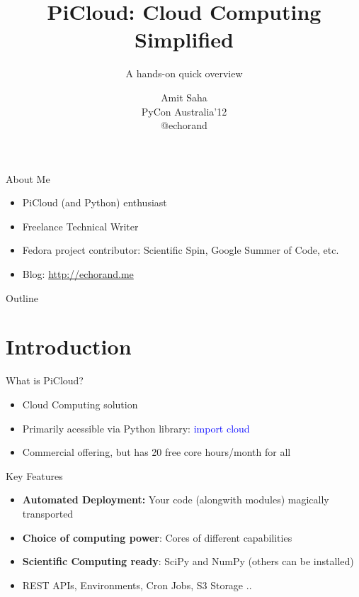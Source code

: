 \documentclass{beamer} \usepackage{fancyvrb} \usepackage{listings}
\title{PiCloud: Cloud Computing Simplified}
\subtitle{A hands-on quick overview}
\author{Amit Saha \\ PyCon Australia'12 \\ @echorand \\ }
\begin{document}
      \begin{frame}
        \titlepage
      \end{frame}

      \begin{frame}{About Me}
        \begin{itemize}
        \item PiCloud (and Python) enthusiast
        \item Freelance Technical Writer
        \item Fedora project contributor: Scientific Spin, Google Summer
          of Code, etc.
        \item Blog: \url{http://echorand.me}
        \end{itemize}
      \end{frame}

      \begin{frame}{Outline}
        \tableofcontents
      \end{frame}


      \section{Introduction}

      \begin{frame}{What is PiCloud?}
        \begin{itemize}
        \item Cloud Computing solution
        \item Primarily acessible via Python library:
          \textcolor{blue}{import cloud}
        \item Commercial offering, but has 20 free core hours/month for
          all
        \end{itemize}
      \end{frame}

      \begin{frame}{Key Features}
        \begin{itemize}
        \item \textbf{Automated Deployment:} Your code (alongwith
          modules) magically transported
        \item \textbf{Choice of computing power}: Cores of different
          capabilities
        \item \textbf{Scientific Computing ready}: SciPy and NumPy
          (others can be installed)
        \item REST APIs, Environments, Cron Jobs, S3 Storage ..
        \end{itemize}
      \end{frame}
\end{document}
